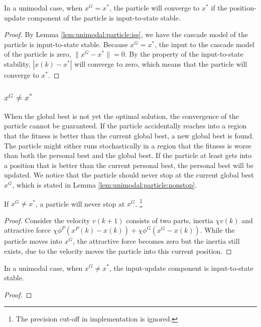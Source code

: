 \begin{mythm}
\label{thm:unimodal:particle:converge}
In a unimodal case, when $ x^{G} = x^{*} $, the particle will converge to $ x^{*} $ if the position-update component of the particle is input-to-state stable.
\begin{proof}
By Lemma \ref{lem:unimodal:particle:iss}, we have the cascade model of the particle is input-to-state stable.
Because $ x^{G} = x^{*} $, the input to the cascade model of the particle is zero, $ \lVert x^{G} - x^{*} \rVert = 0 $.
By the property of the input-to-state stability, $ | x(k) - x^{*} | $ will converge to zero, which means that the particle will converge to $ x^{*} $.
\end{proof}
\end{mythm}

\subsubsection{ $ x^{G} \not = x^{*}  $ }

When the global best is not yet the optimal solution, the convergence of the particle cannot be guaranteed.
If the particle accidentally reaches into a region that the fitness is better than the current global best, a new global best is found.
The particle might either runs stochastically in a region that the fitness is worse than both the personal best and the global best.
If the particle at least gets into a position that is better than the current personal best, the personal best will be updated. 
We notice that the particle should never stop at the current global best $ x^{G} $, which is stated in Lemma \ref{lem:unimodal:particle:nonstop}.

\begin{mylem}
\label{lem:unimodal:particle:nonstop}
If $ x^{G} \not = x^{*} $, a particle will never stop at $ x^{G} $. 
\footnote{The precision cut-off in implementation is ignored.}
\begin{proof}
Consider the velocity $ v(k+1) $ consists of two parts, inertia $ \chi v(k) $ and attractive force $ \chi \phi^{P} (x^{P}(k) - x(k) ) + \chi \phi^{G} ( x^{G} - x(k) ) $.
While the particle moves into $ x^{G} $, the attractive force becomes zero but the inertia still exists, due to the velocity moves the particle into this current position.
\end{proof} 
\end{mylem}

\begin{mylem}
\label{lem:unimodal:particle:input_iss2}
In a unimodal case, when $ x^{G} \not = x^{*} $, the input-update component is input-to-state stable.
\begin{proof}

\end{proof}
\end{mylem}

